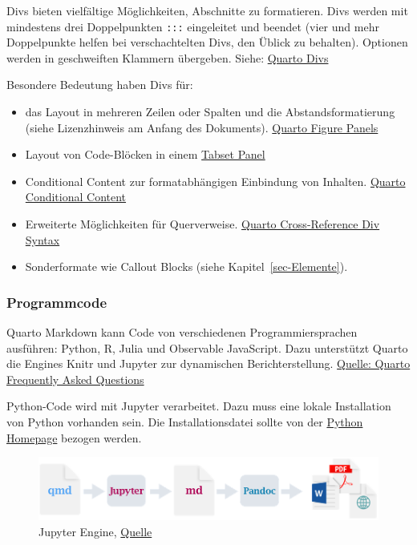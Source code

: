 \documentclass[
  letterpaper,
  DIV=11]{scrartcl}
\begin{document}
Divs bieten vielfältige Möglichkeiten, Abschnitte zu formatieren. Divs
werden mit mindestens drei Doppelpunkten \texttt{:::} eingeleitet und
beendet (vier und mehr Doppelpunkte helfen bei verschachtelten Divs, den
Üblick zu behalten). Optionen werden in geschweiften Klammern übergeben.
Siehe:
\href{https://quarto.org/docs/authoring/markdown-basics.html\#divs-and-spans}{Quarto
Divs}

Besondere Bedeutung haben Divs für:

\begin{itemize}
\item
  das Layout in mehreren Zeilen oder Spalten und die
  Abstandsformatierung (siehe Lizenzhinweis am Anfang des Dokuments).
  \href{https://quarto.org/docs/authoring/figures.html\#figure-panels}{Quarto
  Figure Panels}
\item
  Layout von Code-Blöcken in einem
  \href{https://quarto.org/docs/interactive/layout.html\#tabset-panel}{Tabset
  Panel}
\item
  Conditional Content zur formatabhängigen Einbindung von Inhalten.
  \href{https://quarto.org/docs/authoring/conditional.html}{Quarto
  Conditional Content}
\item
  Erweiterte Möglichkeiten für Querverweise.
  \href{https://quarto.org/docs/authoring/cross-references-divs.html}{Quarto
  Cross-Reference Div Syntax}
\item
  Sonderformate wie Callout Blocks (siehe Kapitel~\ref{sec-Elemente}).
\end{itemize}

\subsubsection{Programmcode}\label{programmcode}

Quarto Markdown kann Code von verschiedenen Programmiersprachen
ausführen: Python, R, Julia und Observable JavaScript. Dazu unterstützt
Quarto die Engines Knitr und Jupyter zur dynamischen Berichterstellung.
\href{https://quarto.org/docs/faq/\#what-programming-languages-are-supported-in-quarto}{Quelle:
Quarto Frequently Asked Questions}

Python-Code wird mit Jupyter verarbeitet. Dazu muss eine lokale
Installation von Python vorhanden sein. Die Installationsdatei sollte
von der \href{https://www.python.org/downloads/}{Python Homepage}
bezogen werden.

\begin{figure}[H]

{\centering \includegraphics{grafiken/Renderpfad_Jupyter.png}

}

\caption{Jupyter Engine,
\href{https://quarto.org/docs/get-started/hello/vscode.html\#how-it-works}{Quelle}}

\end{figure}%
\end{document}
